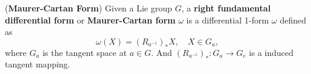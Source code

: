 \begin{definition}(\textbf{Maurer-Cartan Form})
Given a Lie group $G$, a \textbf{right fundamental differential form} or \textbf{Maurer-Cartan form} $\omega$ is a differential 1-form $\omega$ defined as
\begin{equation}
\omega(X) = (R_{a^{-1}})_*X,  \quad X\in G_a,
\end{equation}
where $G_a$ is the tangent space at $a\in G$. And $(R_{a^{-1}})_*:G_a\to G_e$ is a induced tangent mapping.
\end{definition}

